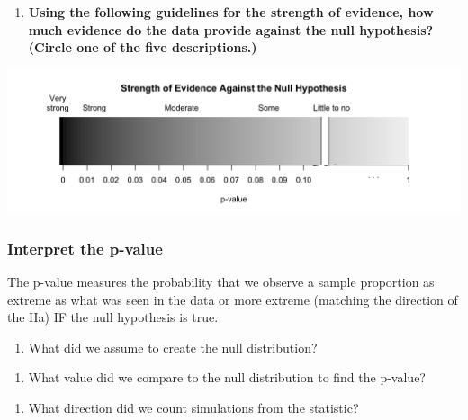 \documentclass[
]{report}
\providecommand{\tightlist}{%
  \setlength{\itemsep}{0pt}\setlength{\parskip}{0pt}}
\begin{document}
\begin{enumerate}
\def\labelenumi{\arabic{enumi}.}
\setcounter{enumi}{8}
\tightlist
\item
  \textbf{Using the following guidelines for the strength of evidence, how much evidence do the data provide against the null hypothesis? (Circle one of the five descriptions.)}
\end{enumerate}

\begin{center}\includegraphics[width=0.9\linewidth]{images/soe_gradient_gray} \end{center}

\hypertarget{interpret-the-p-value}{%
\subsubsection*{Interpret the p-value}\label{interpret-the-p-value}}

The p-value measures the probability that we observe a sample proportion as extreme as what was seen in the data or more extreme (matching the direction of the Ha) IF the null hypothesis is true.

\begin{enumerate}
\def\labelenumi{\arabic{enumi}.}
\setcounter{enumi}{9}
\tightlist
\item
  What did we assume to create the null distribution?
\end{enumerate}

\vspace{1in}

\begin{enumerate}
\def\labelenumi{\arabic{enumi}.}
\setcounter{enumi}{10}
\tightlist
\item
  What value did we compare to the null distribution to find the p-value?
\end{enumerate}

\vspace{0.3in}

\begin{enumerate}
\def\labelenumi{\arabic{enumi}.}
\setcounter{enumi}{11}
\tightlist
\item
  What direction did we count simulations from the statistic?
  \vspace{0.3in}
\end{enumerate}
\end{document}
